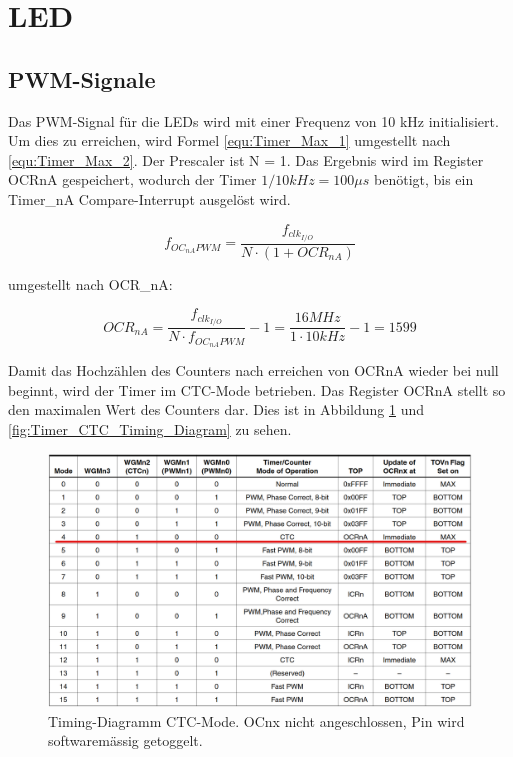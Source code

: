 \section{LED}
\subsection{PWM-Signale}\label{Appendix:Timer_PWM}

Das PWM-Signal für die LEDs wird mit einer Frequenz von 10 kHz initialisiert. Um dies zu erreichen, wird Formel \ref{equ:Timer_Max_1} umgestellt nach \ref{equ:Timer_Max_2}. Der Prescaler ist N = 1. Das Ergebnis wird im Register OCRnA gespeichert, wodurch der Timer $1/10kHz = 100\mu s$ benötigt, bis ein Timer\_nA Compare-Interrupt ausgelöst wird. \cite[S.148]{atmel_atmel_2014}

\begin{equation}
f_{OC_{nA}PWM} = \frac{f_{clk_{I/O}}}{N \cdot (1+OCR_{nA})}
\label{equ:Timer_Max_1}
\end{equation}

umgestellt nach OCR\_nA:

\begin{equation}
OCR_{nA} = \frac{f_{clk_{I/O}}}{N \cdot f_{OC_{nA}PWM}} - 1 = \frac{16MHz}{1 \cdot 10kHz} - 1 = 1599
\label{equ:Timer_Max_2}
\end{equation}

Damit das Hochzählen des Counters nach erreichen von OCRnA wieder bei null beginnt, wird der Timer im CTC-Mode betrieben. Das Register OCRnA stellt so den maximalen Wert des Counters dar. Dies ist in Abbildung \ref {fig:Timer_CTC_Mode} und \ref{fig:Timer_CTC_Timing_Diagram} zu sehen.

\begin{figure}[h!]
	\centering
	\includegraphics[width=\textwidth]{graphics/Timer_CTC_Mode}
	\caption{Timing-Diagramm CTC-Mode. OCnx nicht angeschlossen, Pin wird softwaremässig getoggelt.\cite[S.145]{atmel_atmel_2014}}
	\label{fig:Timer_CTC_Mode}
\end{figure}

